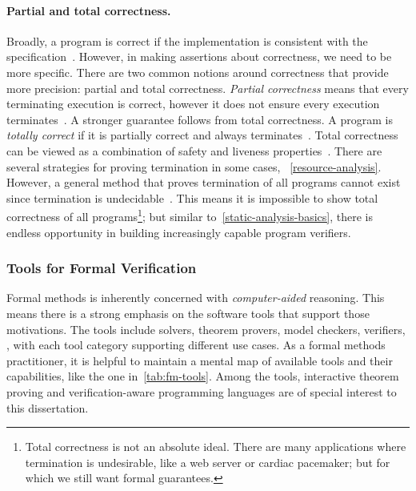 \paragraph*{Partial and total correctness.}
Broadly, a program is correct if the implementation is consistent with the specification~\cite{furia2014b}.
However, in making assertions about correctness, we need to be more specific.
There are two common notions around correctness that provide more precision: partial and total correctness.
\emph{Partial correctness} means that every terminating execution is correct, however it does not ensure every execution terminates~\cite[p. 64]{leino2023}.
A stronger guarantee follows from total correctness.
A program is \emph{totally correct} if it is partially correct and always terminates~\cite[p. 64]{leino2023}.
Total correctness can be viewed as a combination of safety and liveness properties~\cite{lamport1977}.
There are several strategies for proving termination in some cases, \cf~\autoref{resource-analysis}.
However, a general method that proves termination of all programs cannot exist since termination is undecidable~\cite{turing1936}.
This means it is impossible to show total correctness of all programs\footnote{
Total correctness is not an absolute ideal.
There are many applications where termination is undesirable, like a web server or cardiac pacemaker; but for which we still want formal guarantees.};
but similar to~\autoref{static-analysis-basics},
there is endless opportunity in building increasingly capable program verifiers.

\subsubsection{Tools for Formal Verification}

Formal methods is inherently concerned with \emph{computer-aided} reasoning.
This means there is a strong emphasis on the software tools that support those motivations.
The tools include solvers, theorem provers, model checkers, verifiers, \etc, with each tool category supporting different use cases.
As a formal methods practitioner, it is helpful to maintain a mental map of available tools and their capabilities, like the one in~\autoref{tab:fm-tools}.
Among the tools, interactive theorem proving and verification-aware programming languages are of special interest to this dissertation.

